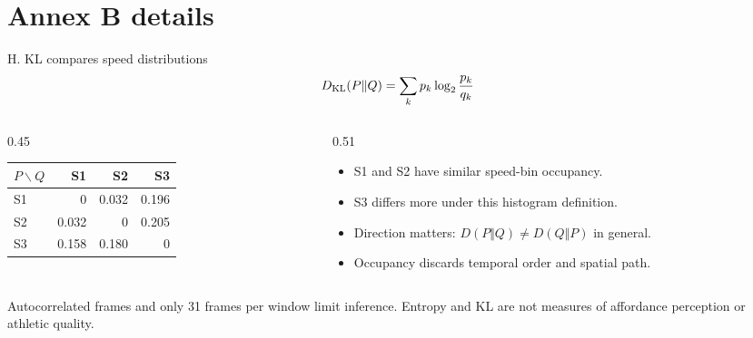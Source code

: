 \section{Annex B details}
\begin{frame}{H. KL compares speed distributions}
\[
D_{\rm KL}(P\Vert Q)=\sum_k p_k\log_2\frac{p_k}{q_k}
\]
\begin{columns}[c,onlytextwidth]
\begin{column}{0.45\textwidth}
\centering
\begin{tabular}{@{}lrrr@{}}\toprule
$P\backslash Q$ & S1 & S2 & S3\\\midrule
S1 & 0 & 0.032 & 0.196\\
S2 & 0.032 & 0 & 0.205\\
S3 & 0.158 & 0.180 & 0\\\bottomrule
\end{tabular}\par
\par\par{}
\end{column}
\begin{column}{0.51\textwidth}
\begin{itemize}\small
\item S1 and S2 have similar speed-bin occupancy.
\item S3 differs more under this histogram definition.
\item Direction matters: $D(P\Vert Q)\neq D(Q\Vert P)$ in general.
\item Occupancy discards temporal order and spatial path.
\end{itemize}
\end{column}
\end{columns}
\par\bigskip
\small Autocorrelated frames and only 31 frames per window limit inference. Entropy and KL are not measures of affordance perception or athletic quality.
\end{frame}

